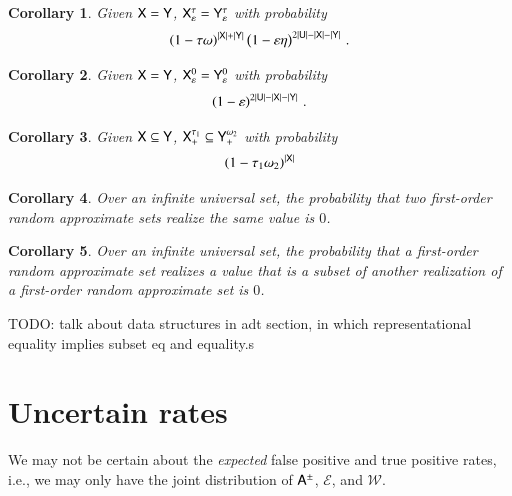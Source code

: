 \documentclass[10pt,final,hidelinks]{article}
\numberwithin{equation}{section}
\DeclarePairedDelimiter\Card{\lvert}{\rvert}
\newcommand{\FNR}{\mathcal{W}}
\newcommand{\FPR}{\mathcal{E}}
\newcommand{\tprate}{\tau}
\newcommand{\fprate}{\varepsilon}
\newcommand{\fnrate}{\omega}
\newcommand{\tnrate}{\eta}
\theoremstyle{plain}
\newtheorem{corollary}{Corollary}[theorem]
\begin{document}
\begin{corollary}
	Given $\Set{X} = \Set{Y}$, $\ASet{X}[\fprate][\tprate] = \ASet{Y}[\fprate][\tprate]$ with probability
	\begin{equation}
	\left(1 - \tprate\fnrate\right)^{\Card{\Set{X}}+\Card{\Set{Y}}}
	\left(1 - \fprate\tnrate\right)^{2 \Card{\Set{U}} - \Card{\Set{X}} - \Card{\Set{Y}}}\,.
	\end{equation}
\end{corollary}


\begin{corollary}
	Given $\Set{X} = \Set{Y}$, $\ASet{X}[\fprate][0] = \ASet{Y}[\fprate][0]$ with probability
	\begin{equation}
	\left(1 - \fprate\right)^{2 \Card{\Set{U}} - \Card{\Set{X}} - \Card{\Set{Y}}}\,.
	\end{equation}
\end{corollary}

\begin{corollary}
	Given $\Set{X} \subseteq \Set{Y}$, $\ASet{X}[+][\tprate_1] \subseteq \ASet{Y}[+][\fnrate_2]$ with probability
	\begin{equation}
	\left(1 - \tprate_1\fnrate_2\right)^{\Card{\Set{X}}}
	\end{equation}
\end{corollary}




\begin{corollary}
	Over an infinite universal set, the probability that two first-order random approximate sets realize the same value is $0$.
\end{corollary}


\begin{corollary}
	Over an infinite universal set, the probability that a first-order random approximate set realizes a value that is a subset of another realization of a first-order random approximate set is $0$.
\end{corollary}

TODO: talk about data structures in adt section, in which representational equality implies subset eq and equality.s
\section{Uncertain rates}
\label{sec:intervals}
We may not be certain about the \emph{expected} false positive and true positive rates, i.e., we may only have the joint distribution of $\ASet{A}$, $\FPR$, and $\FNR$.
\end{document}
